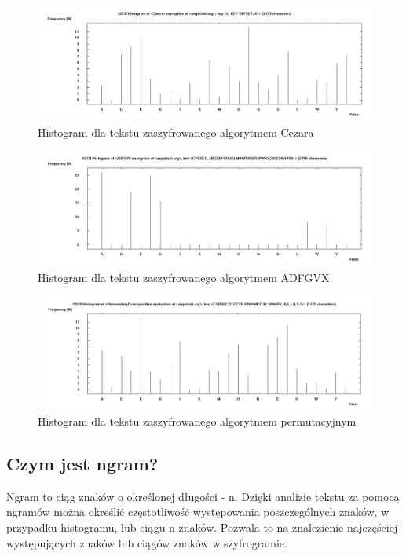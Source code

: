 \documentclass{article}
\begin{document}
\begin{figure}[H]
    \centering
    \includegraphics[width=\textwidth]{cezar_hisogram.png}
    \caption{Histogram dla tekstu zaszyfrowanego algorytmem Cezara}
\end{figure}

\begin{figure}[H]
    \centering
    \includegraphics[width=\textwidth]{adfgvx_hisogram.png}
    \caption{Histogram dla tekstu zaszyfrowanego algorytmem ADFGVX}
\end{figure}

\begin{figure}[H]
    \centering
    \includegraphics[width=\textwidth]{permutacyjny_histogram.png}
    \caption{Histogram dla tekstu zaszyfrowanego algorytmem permutacyjnym}
\end{figure}
\subsection*{Czym jest ngram?}
Ngram to ciąg znaków o określonej długości - n. Dzięki analizie tekstu za pomocą ngramów można określić częstotliwość występowania poszczególnych znaków, w 
przypadku histogramu, lub ciągu n znaków. Pozwala to na znalezienie najczęściej występujących znaków lub ciągów znaków w szyfrogramie.
\end{document}
